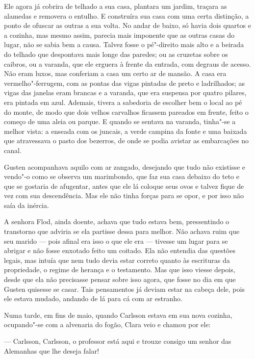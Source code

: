 Ele agora já cobrira de telhado a sua casa, plantara um jardim,
traçara as alamedas e removera o entulho. E construíra sua casa com uma certa
distinção, a ponto de ofuscar as outras a sua volta. No andar de baixo, só
havia dois quartos e a cozinha, mas mesmo assim, parecia mais imponente que
as outras casas do lugar, não se sabia bem a causa. Talvez fosse o pé"-direito
mais alto e a beirada do telhado que despontava mais longe das paredes; ou 
as cruzetas sobre os caibros, ou a varanda, que ele
erguera à frente da entrada, com degraus de acesso. Não eram luxos, mas
conferiam a casa um certo ar de mansão. A casa era vermelho"-ferrugem, com as pontas
das vigas pintadas de preto e ladrilhados; as vigas das janelas eram
brancas e a varanda, que era suspensa por quatro pilares, era pintada em azul.
Ademais, tivera a sabedoria de escolher bem o local ao pé do monte, de modo
que dois velhos carvalhos ficassem pareados em frente, feito o começo de uma
aleia ou parque. E quando se sentava na varanda, tinha"-se a melhor vista: a
enseada com os juncais, a verde campina da fonte e uma baixada que atravessava o
pasto dos bezerros, de onde se podia avistar as embarcações no canal.

Gusten acompanhava aquilo com ar zangado, desejando que tudo não existisse 
e vendo"-o como se observa um marimbondo, que faz sua casa debaixo do
teto e que se gostaria de afugentar, antes que ele lá coloque seus ovos e talvez
fique de vez com sua descendência. Mas ele não tinha forças para se opor, e por
isso não saía da inércia.

A senhora Flod, ainda doente, achava que tudo estava bem, pressentindo o
transtorno que adviria se ela partisse dessa para melhor. Não achava ruim que
seu marido --- pois afinal era isso o que ele era --- tivesse um lugar para se
abrigar e não fosse enxotado feito um coitado. Ela não entendia das questões
legais, mas intuía que nem tudo devia estar correto quanto às escrituras da
propriedade, o regime de herança e o testamento. Mas que isso viesse depois,
desde que ela não precisasse pensar sobre isso agora, que fosse no dia em que
Gusten quisesse se casar. Tais pensamentos já deviam estar na cabeça dele,
pois ele estava mudado, andando de lá para cá com ar estranho. 

Numa tarde, em fins de maio, quando Carlsson estava em sua nova cozinha, ocupando"-se com a
alvenaria do fogão, Clara veio e chamou por ele: 

--- Carlsson, Carlsson, o professor está aqui e trouxe consigo um senhor das 
Alemanhas que lhe deseja falar!

